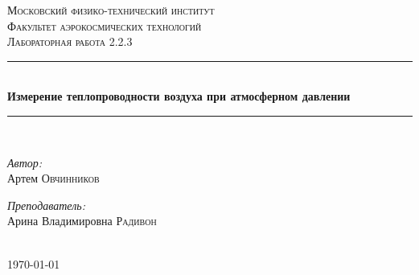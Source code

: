 \documentclass[a4paper,12pt]{article} %
\begin{document}
\begin{titlepage}
\newcommand{\HRule}{\rule{\linewidth}{0.3 mm}} %

\center %
 

\textsc{\Large Московский физико-технический институт }\\[1.5cm] %
\textsc{\Large Факультет аэрокосмических технологий}\\[0.5cm] %
\textsc{\large Лабораторная работа 2.2.3}\\[0.5cm] %


\HRule \\[0.4cm]
{ \huge \bfseries Измерение теплопроводности воздуха при атмосферном давлении }\\[0.4cm] %
\HRule \\[1.5cm]
 

\begin{minipage}{0.4\textwidth}
\begin{flushleft} \large
\emph{Автор:}\\ Артем \textsc{Овчинников} %
\end{flushleft}
\end{minipage}
\begin{minipage}{0.4\textwidth}
\begin{flushright} \large
\emph{Преподаватель:} \\
Арина Владимировна \textsc{Радивон} %
\end{flushright}
\end{minipage}\\[4cm]

{\large \today}\\[2cm] %


 

\vfill %

\end{titlepage}
\tableofcontents
\newpage
\end{document}

